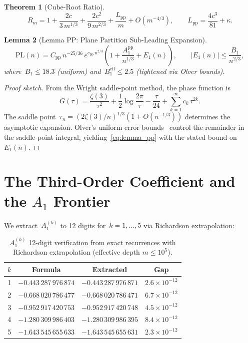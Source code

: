 \documentclass[11pt,a4paper]{article}
\newtheorem{theorem}{Theorem}[section]
\newtheorem{lemma}[theorem]{Lemma}
\begin{document}
\begin{theorem}[Cube-Root Ratio]\label{thm:cuberoot}
\begin{equation}\label{eq:cuberoot}
  R_m = 1 + \frac{2c}{3\,m^{1/3}} + \frac{2c^2}{9\,m^{2/3}} + \frac{L_{\mathrm{pp}}}{m} + O(m^{-4/3}),
  \qquad L_{\mathrm{pp}} = \frac{4c^3}{81} + \kappa.
\end{equation}
\end{theorem}

\begin{lemma}[Lemma PP: Plane Partition Sub-Leading Expansion]\label{lem:pp}
\begin{equation}\label{eq:lemma_pp}
  \mathrm{PL}(n) = C_{\mathrm{pp}}\,n^{-25/36}\,e^{c_{\mathrm{pp}}\,n^{2/3}}\!\left(1 + \frac{A_1^{\mathrm{pp}}}{n^{1/3}} + E_1(n)\right),
  \qquad |E_1(n)| \leq \frac{B_1}{n^{2/3}},
\end{equation}
where~$B_1 \leq 18.3$ (uniform) and~$B_1^{\mathrm{eff}} \leq 2.5$ (tightened via Olver bounds).
\end{lemma}

\begin{proof}[Proof sketch]
From the Wright saddle-point method, the phase function is
\[
  G(\tau) = \frac{\zeta(3)}{\tau^2} + \frac{1}{2}\log\frac{2\pi}{\tau} - \frac{\tau}{24} + \sum_{k=1}^{\infty} c_k\,\tau^{2k}.
\]
The saddle point~$\tau_n = (2\zeta(3)/n)^{1/3}(1 + O(n^{-1/3}))$ determines the asymptotic expansion. Olver's uniform error bounds~\cite{olver1974} control the remainder in the saddle-point integral, yielding~\eqref{eq:lemma_pp} with the stated bound on~$E_1(n)$.
\end{proof}

\section{The Third-Order Coefficient and the \texorpdfstring{$A_1$}{A1} Frontier}\label{sec:A1}

We extract~$A_1^{(k)}$ to 12 digits for~$k = 1, \ldots, 5$ via Richardson extrapolation:

\begin{table}[ht]
\centering
\caption{$A_1^{(k)}$ 12-digit verification from exact recurrences with Richardson extrapolation (effective depth $m\le 10^5$).}
\label{tab:A1}
\begin{tabular}{@{}cccc@{}}
\toprule
$k$ & Formula & Extracted & Gap \\
\midrule
1 & $-0.443\,287\,976\,874$ & $-0.443\,287\,976\,871$ & $2.6\times 10^{-12}$ \\
2 & $-0.668\,020\,786\,477$ & $-0.668\,020\,786\,471$ & $6.7\times 10^{-12}$ \\
3 & $-0.952\,917\,420\,753$ & $-0.952\,917\,420\,748$ & $4.5\times 10^{-12}$ \\
4 & $-1.280\,309\,986\,403$ & $-1.280\,309\,986\,395$ & $8.4\times 10^{-12}$ \\
5 & $-1.643\,545\,655\,633$ & $-1.643\,545\,655\,631$ & $2.3\times 10^{-12}$ \\
\bottomrule
\end{tabular}
\end{table}
\end{document}
